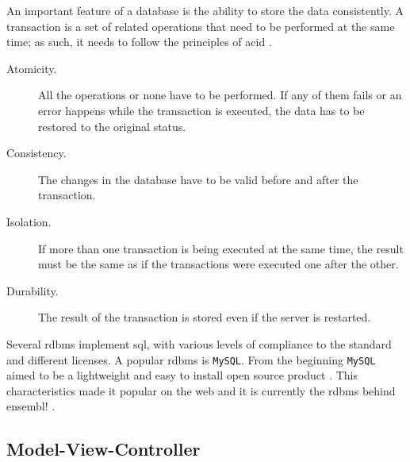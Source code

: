 An important feature of a database is the ability to store the data consistently.
A transaction is a set of related operations that need to be performed at the same time; as such, it needs to follow the principles of \gls{acid} \citep{Haerder1983}.


\begin{description}
\item[Atomicity.] All the operations or none have to be performed. If any of them fails or an error happens while the transaction is executed, the data has to be restored to the original status. 
\item[Consistency.] The changes in the database have to be valid before and after the transaction. 
\item[Isolation.] If more than one transaction is being executed at the same time, the result must be the same as if the transactions were executed one after the other. 
\item[Durability.] The result of the transaction is stored even if the server is restarted.
\end{description}  


Several \gls{rdbms} implement \acrshort{sql}, with various levels of compliance to the standard and different licenses.  
A popular \acrshort{rdbms} is \texttt{MySQL}.
From the beginning \texttt{MySQL} aimed to be a lightweight and easy to install open source product \citep{Oracle2014}. 
This characteristics made it popular on the web and it is currently the \gls{rdbms} behind ensembl! \citep{Flicek2012}. 

\subsection{Model-View-Controller}

